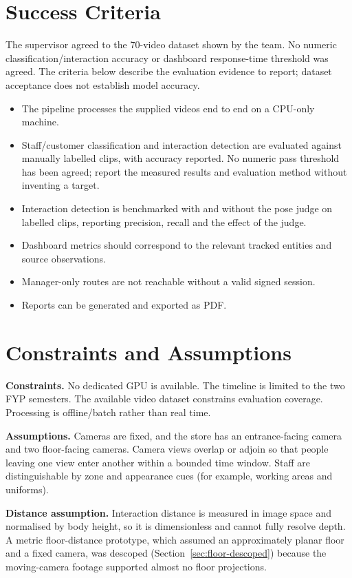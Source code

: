 \section{Success Criteria}
The supervisor agreed to the 70-video dataset shown by the team. No numeric classification/interaction accuracy or dashboard response-time threshold was agreed. The criteria below describe the evaluation evidence to report; dataset acceptance does not establish model accuracy.
\begin{itemize}
\item The pipeline processes the supplied videos end to end on a CPU-only machine.
\item Staff/customer classification and interaction detection are evaluated against manually labelled clips, with accuracy reported. No numeric pass threshold has been agreed; report the measured results and evaluation method without inventing a target.
\item Interaction detection is benchmarked with and without the pose judge on labelled clips, reporting precision, recall and the effect of the judge.
\item Dashboard metrics should correspond to the relevant tracked entities and source observations.
\item Manager-only routes are not reachable without a valid signed session.
\item Reports can be generated and exported as PDF.
\end{itemize}

\section{Constraints and Assumptions}
\textbf{Constraints.} No dedicated GPU is available. The timeline is limited to the two FYP semesters. The available video dataset constrains evaluation coverage. Processing is offline/batch rather than real time.

\textbf{Assumptions.} Cameras are fixed, and the store has an entrance-facing camera and two floor-facing cameras. Camera views overlap or adjoin so that people leaving one view enter another within a bounded time window. Staff are distinguishable by zone and appearance cues (for example, working areas and uniforms).

\textbf{Distance assumption.} Interaction distance is measured in image space and normalised by body height, so it is dimensionless and cannot fully resolve depth. A metric floor-distance prototype, which assumed an approximately planar floor and a fixed camera, was descoped (Section~\ref{sec:floor-descoped}) because the moving-camera footage supported almost no floor projections.


